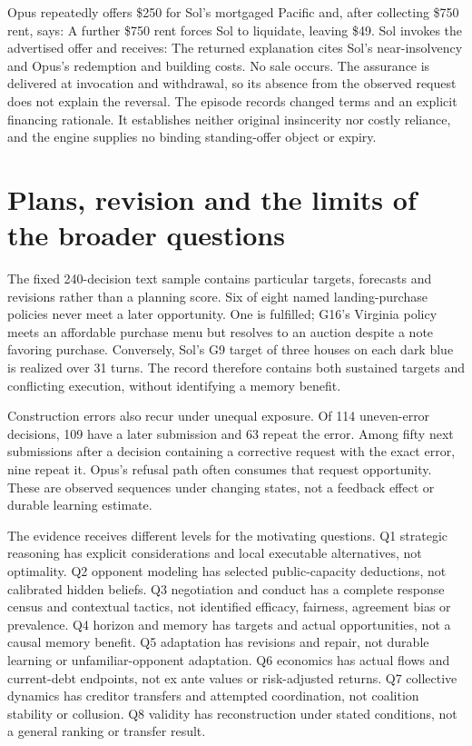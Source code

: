 
Opus repeatedly offers \$250 for Sol's mortgaged Pacific and, after collecting \$750 rent, says:
A further \$750 rent forces Sol to liquidate, leaving \$49. Sol invokes the advertised offer and receives:
The returned explanation cites Sol's near-insolvency and Opus's redemption and building costs. No sale occurs. The assurance is delivered at invocation and withdrawal, so its absence from the observed request does not explain the reversal. The episode records changed terms and an explicit financing rationale. It establishes neither original insincerity nor costly reliance, and the engine supplies no binding standing-offer object or expiry.

\section{Plans, revision and the limits of the broader questions}

The fixed 240-decision text sample contains particular targets, forecasts and revisions rather than a planning score. Six of eight named landing-purchase policies never meet a later opportunity. One is fulfilled; G16's Virginia policy meets an affordable purchase menu but resolves to an auction despite a note favoring purchase. Conversely, Sol's G9 target of three houses on each dark blue is realized over 31 turns. The record therefore contains both sustained targets and conflicting execution, without identifying a memory benefit.

Construction errors also recur under unequal exposure. Of 114 uneven-error decisions, 109 have a later submission and 63 repeat the error. Among fifty next submissions after a decision containing a corrective request with the exact error, nine repeat it. Opus's refusal path often consumes that request opportunity. These are observed sequences under changing states, not a feedback effect or durable learning estimate.

The evidence receives different levels for the motivating questions. Q1 strategic reasoning has explicit considerations and local executable alternatives, not optimality. Q2 opponent modeling has selected public-capacity deductions, not calibrated hidden beliefs. Q3 negotiation and conduct has a complete response census and contextual tactics, not identified efficacy, fairness, agreement bias or prevalence. Q4 horizon and memory has targets and actual opportunities, not a causal memory benefit. Q5 adaptation has revisions and repair, not durable learning or unfamiliar-opponent adaptation. Q6 economics has actual flows and current-debt endpoints, not ex ante values or risk-adjusted returns. Q7 collective dynamics has creditor transfers and attempted coordination, not coalition stability or collusion. Q8 validity has reconstruction under stated conditions, not a general ranking or transfer result.

